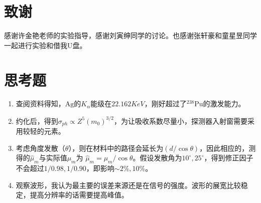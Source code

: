 \documentclass{article}
\begin{document}
    \section{致谢}
    感谢许金艳老师的实验指导，感谢刘寅绅同学的讨论。也感谢张轩豪和童星昱同学一起进行实验和借我U盘。
    \clearpage
    \appendix
    \appendixpage
    \section{思考题}
    \begin{enumerate}
        \item 查阅资料得知，$\text{Ag}$的$K_\alpha$能级在$22.162\si{KeV}$，刚好超过了$^{238}\text{Pu}$的激发能力。
        \item 约化后，得到$\sigma_{ph} \propto Z^5(m_0)^{3/2}$，为让吸收系数尽量小，探测器入射窗需要采用较轻的元素。
        \item 考虑角度发散（$\theta$），则在材料中的路径会延长为$(d/\cos\theta)$，因此相应的，测得的$\hat{\mu}_m$与实际值$\mu_m$为 $\hat{\mu}_m= \mu_m/\cos\theta$。假设发散角为$10^\circ,25^\circ$，得到修正因子不会超过$1/0.98,1/0.90$，即影响$\sim 2\%,10\%$。
        \item 观察波形，我认为最主要的误差来源还是在信号的强度。波形的展宽比较稳定，提高分辨率的话需要提高峰值。
    \end{enumerate}
\end{document}
